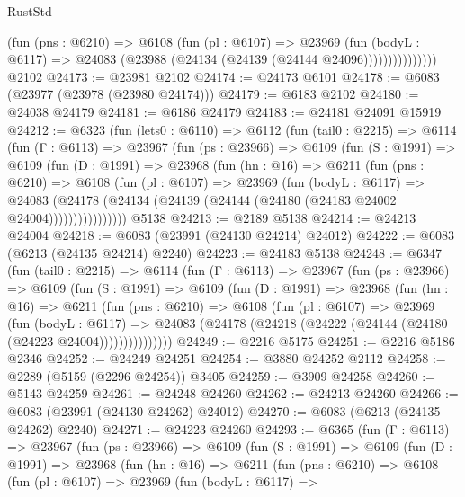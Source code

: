 \begin{lexlean}{RustStd}
\begin{coremodule}
                    (fun (pns : @6210) =>
                    @6108
                      (fun (pl : @6107) =>
                      @23969
                        (fun (bodyL : @6117) =>
                        @24083 (@23988 (@24134 (@24139 (@24144 @24096)))))))))))))))
    @2102
@24173 := @23981 @2102
@24174 := @24173 @6101
@24178 := @6083 (@23977 (@23978 (@23980 @24174)))
@24179 := @6183 @2102
@24180 := @24038 @24179
@24181 := @6186 @24179
@24183 := @24181 @24091 @15919
@24212 := @6323
    (fun (lets0 : @6110) =>
    @6112
      (fun (tail0 : @2215) =>
      @6114
        (fun (Γ : @6113) =>
        @23967
          (fun (ps : @23966) =>
          @6109
            (fun (S : @1991) =>
            @6109
              (fun (D : @1991) =>
              @23968
                (fun (hn : @16) =>
                @6211
                  (fun (pns : @6210) =>
                  @6108
                    (fun (pl : @6107) =>
                    @23969
                      (fun (bodyL : @6117) =>
                      @24083
                        (@24178
                          (@24134 (@24139 (@24144 (@24180 (@24183 @24002 @24004))))))))))))))))
    @5138
@24213 := @2189 @5138
@24214 := @24213 @24004
@24218 := @6083 (@23991 (@24130 @24214) @24012)
@24222 := @6083 (@6213 (@24135 @24214) @2240)
@24223 := @24183 @5138
@24248 := @6347
    (fun (tail0 : @2215) =>
    @6114
      (fun (Γ : @6113) =>
      @23967
        (fun (ps : @23966) =>
        @6109
          (fun (S : @1991) =>
          @6109
            (fun (D : @1991) =>
            @23968
              (fun (hn : @16) =>
              @6211
                (fun (pns : @6210) =>
                @6108
                  (fun (pl : @6107) =>
                  @23969
                    (fun (bodyL : @6117) =>
                    @24083 (@24178 (@24218 (@24222 (@24144 (@24180 (@24223 @24004)))))))))))))))
@24249 := @2216 @5175
@24251 := @2216 @5186 @2346
@24252 := @24249 @24251
@24254 := @3880 @24252 @2112
@24258 := @2289 (@5159 (@2296 @24254)) @3405
@24259 := @3909 @24258
@24260 := @5143 @24259
@24261 := @24248 @24260
@24262 := @24213 @24260
@24266 := @6083 (@23991 (@24130 @24262) @24012)
@24270 := @6083 (@6213 (@24135 @24262) @2240)
@24271 := @24223 @24260
@24293 := @6365
    (fun (Γ : @6113) =>
    @23967
      (fun (ps : @23966) =>
      @6109
        (fun (S : @1991) =>
        @6109
          (fun (D : @1991) =>
          @23968
            (fun (hn : @16) =>
            @6211
              (fun (pns : @6210) =>
              @6108
                (fun (pl : @6107) =>
                @23969
                  (fun (bodyL : @6117) =>

\end{coremodule}
\end{lexlean}
